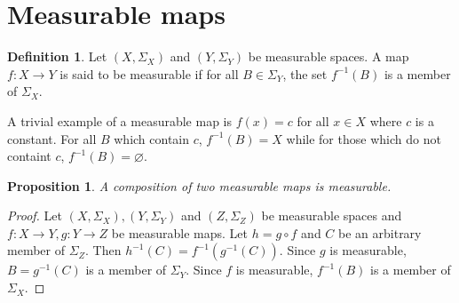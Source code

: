\documentclass{article}
\theoremstyle{plain}
\numberwithin{thm}{section}
\theoremstyle{plain}
\newtheorem{prop}{Proposition}
\numberwithin{prop}{section}
\theoremstyle{definition}
\newtheorem{defn}{Definition}
\numberwithin{defn}{section}
\theoremstyle{remark}
\theoremstyle{plain}
\numberwithin{cor}{section}
\numberwithin{equation}{section}
\begin{document}
\section{Measurable maps}\label{s2}
\begin{defn}\label{s2d1}
Let $(X, \Sigma_X)$ and $(Y, \Sigma_Y)$ be measurable spaces. A map $f: X
\rightarrow Y$ is said to be measurable if for all $B \in \Sigma_Y$, the set
$f^{-1}(B)$ is a member of $\Sigma_X$.
\end{defn}

A trivial example of a measurable map is $f(x) = c$ for all $x \in X$ where $c$
is a constant. For all $B$ which contain $c$, $f^{-1}(B) = X$ while for those 
which do not containt $c$, $f^{-1}(B) = \varnothing$.

\begin{prop}\label{s2p1}
A composition of two measurable maps is measurable.
\end{prop}
\begin{proof}
Let $(X, \Sigma_X), (Y, \Sigma_Y)$ and $(Z, \Sigma_Z)$ be measurable spaces and
$f:X \rightarrow Y, g: Y \rightarrow Z$ be measurable maps. Let $h = g \circ f$
and $C$ be an arbitrary member of $\Sigma_Z$. Then $h^{-1}(C) = f^{-1}(g^{-1}(C))$.
Since $g$ is measurable, $B = g^{-1}(C)$ is a member of $\Sigma_Y$. Since $f$ is
measurable, $f^{-1}(B)$ is a member of $\Sigma_X$.
\end{proof}
\end{document}

